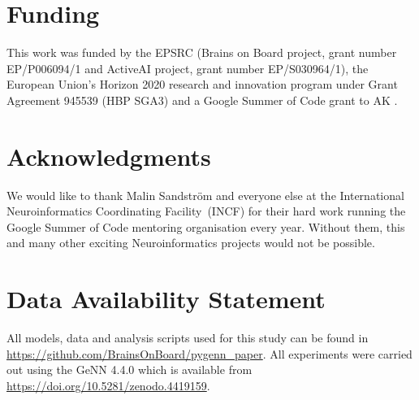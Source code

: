 \documentclass[utf8]{frontiersSCNS} %
\begin{document}
\section*{Funding}
This work was funded by the EPSRC (Brains on Board project, grant number EP/P006094/1 and ActiveAI project, grant number EP/S030964/1), the
European Union’s Horizon 2020 research and innovation program under Grant Agreement 945539 (HBP SGA3) and a Google Summer of Code grant to AK .

\section*{Acknowledgments}
We would like to thank Malin Sandstr\"{o}m and everyone else at the International Neuroinformatics Coordinating Facility~(INCF) for their hard work running the Google Summer of Code mentoring organisation every year.
Without them, this and many other exciting Neuroinformatics projects would not be possible.

\section*{Data Availability Statement}
All models, data and analysis scripts used for this study can be found in \url{https://github.com/BrainsOnBoard/pygenn_paper}.
All experiments were carried out using the GeNN 4.4.0 which is available from \url{https://doi.org/10.5281/zenodo.4419159}.


\end{document}
